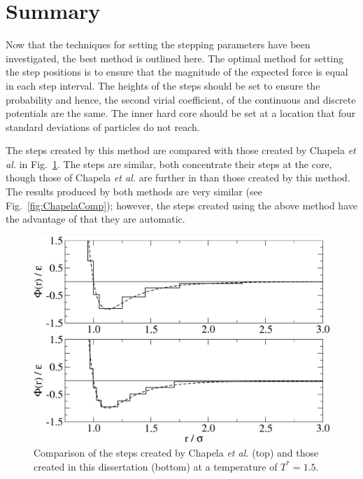 \documentclass[12pt]{UoAthesis} \usepackage{booktabs}
\begin{document}
\section{Summary}

Now that the techniques for setting the stepping parameters have been
investigated, the best method is outlined here.  The optimal method
for setting the step positions is to ensure that the magnitude of the
expected force is equal in each step interval.  The heights of the
steps should be set to ensure the probability and hence, the second
virial coefficient, of the continuous and discrete potentials are the
same.  The inner hard core should be set at a location that four
standard deviations of particles do not reach.

The steps created by this method are compared with those created by
Chapela \textit{et al.} in Fig.~\ref{fig:stepComp}.  The steps are
similar, both concentrate their steps at the core, though those of
Chapela \textit{et al.} are further in than those created by this
method.  The results produced by both methods are very similar
(see Fig.~\ref{fig:ChapelaComp}); however, the steps created using the
above method have the advantage of that they are automatic.

\begin{figure}[htp] 
  \begin{center}
    \includegraphics[clip,scale=0.45]{figures/stepComp} 
    \caption[Comparison of the steps created by Chapela \textit{et
      al.} and those created in this dissertation]
    {Comparison of the steps created by Chapela \textit{et al.} (top)
      and those created in this dissertation (bottom) at a temperature
      of $T^*=1.5$.}
    \label{fig:stepComp}
  \end{center}
\end{figure}
\end{document}
